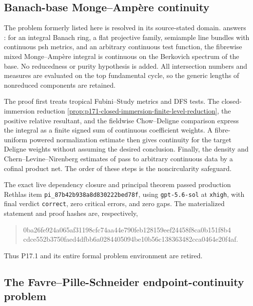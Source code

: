 \subsection{Banach-base Monge--Amp\`ere continuity}

The problem formerly listed here is resolved in its source-stated domain.
 answers
\cite[Question~4.9]{PS23Hybrid}: for an integral Banach ring, a flat
projective family, semiample line bundles with continuous psh metrics, and
an arbitrary continuous test function, the fibrewise mixed
Monge--Amp\`ere integral is continuous on the Berkovich spectrum of the
base.  No reducedness or purity hypothesis is added.  All intersection
numbers and measures are evaluated on the top fundamental cycle, so the
generic lengths of nonreduced components are retained.

The proof first treats tropical Fubini--Study metrics and DFS tests.  The
closed-immersion reduction
\cref{prop:p171-closed-immersion-finite-level-reduction}, the positive
relative resultant, and the fieldwise Chow--Deligne comparison express the
integral as a finite signed sum of continuous coefficient weights.  A
fibre-uniform powered normalization estimate then gives continuity for the
target Deligne weights without assuming the desired conclusion.  Finally,
the density and Chern--Levine--Nirenberg estimates of
\cite[Lemma~4.10]{PS23Hybrid} pass to arbitrary continuous data by a cofinal product
net.  The order of these steps is the noncircularity safeguard.

The exact live dependency closure and principal theorem passed production
Rethlas item \texttt{pi\_87b42b938a8d830222bed78f}, using
\texttt{gpt-5.6-sol} at \texttt{xhigh}, with final verdict
\texttt{correct}, zero critical errors, and zero gaps.  The materialized
statement and proof hashes are, respectively,
\begin{quote}
\small\ttfamily
0ba26fe924a065af31198cfc74aa44e790feb128159eef24458f8ca0b151f8b4\\
cdce552b3750faed4dfbb6a0284405094be10b56c138363482cca0464e20f4af.
\end{quote}
Thus P17.1 and its entire formal problem environment are retired.

\subsection{The Favre--Pille-Schneider endpoint-continuity problem}

